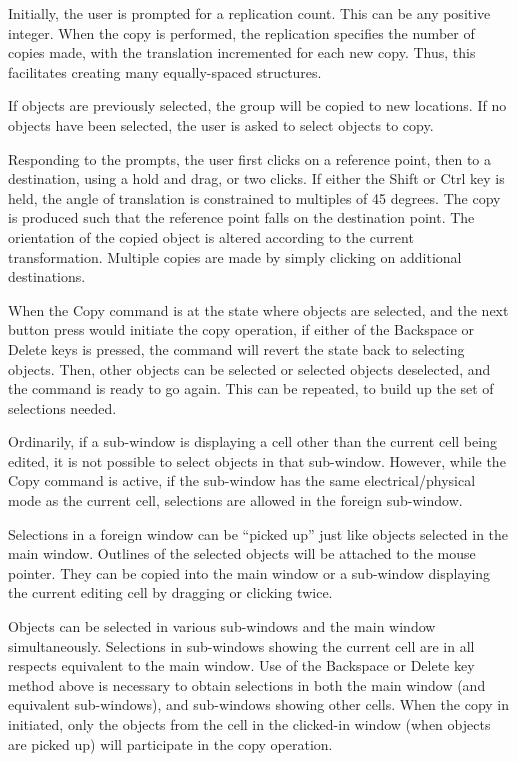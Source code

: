 Initially, the user is prompted for a replication count.  This can be
any positive integer.  When the copy is performed, the replication
specifies the number of copies made, with the translation incremented
for each new copy.  Thus, this facilitates creating many
equally-spaced structures.

If objects are previously selected, the group will be copied to new
locations.  If no objects have been selected, the user is asked to
select objects to copy.

Responding to the prompts, the user first clicks on a reference point,
then to a destination, using a hold and drag, or two clicks.  If
either the {\kb Shift} or {\kb Ctrl} key is held, the angle of
translation is constrained to multiples of 45 degrees.  The copy is
produced such that the reference point falls on the destination point. 
The orientation of the copied object is altered according to the
current transformation.  Multiple copies are made by simply clicking
on additional destinations.

When the {\cb Copy} command is at the state where objects are
selected, and the next button press would initiate the copy operation,
if either of the {\kb Backspace} or {\kb Delete} keys is pressed, the
command will revert the state back to selecting objects.  Then, other
objects can be selected or selected objects deselected, and the
command is ready to go again.  This can be repeated, to build up the
set of selections needed.

Ordinarily, if a sub-window is displaying a cell other than the
current cell being edited, it is not possible to select objects in
that sub-window.  However, while the {\cb Copy} command is active, if
the sub-window has the same electrical/physical mode as the current
cell, selections are allowed in the foreign sub-window.

Selections in a foreign window can be ``picked up'' just like objects
selected in the main window.  Outlines of the selected objects will be
attached to the mouse pointer.  They can be copied into the main
window or a sub-window displaying the current editing cell by dragging
or clicking twice.

Objects can be selected in various sub-windows and the main window
simultaneously.  Selections in sub-windows showing the current cell
are in all respects equivalent to the main window.  Use of the {\kb
Backspace} or {\kb Delete} key method above is necessary to obtain
selections in both the main window (and equivalent sub-windows), and
sub-windows showing other cells.  When the copy in initiated, only
the objects from the cell in the clicked-in window (when objects are
picked up) will participate in the copy operation.

